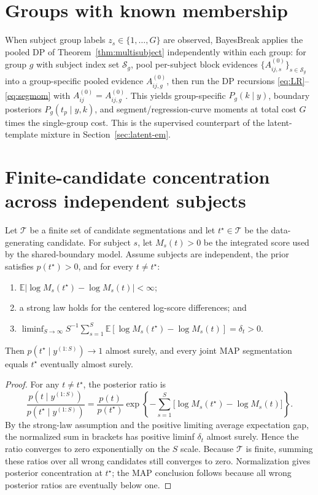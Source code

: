 \section{Groups with known membership}
\label{sec:groups-known}

When subject group labels $z_s\in\{1,\dots,G\}$ are observed, BayesBreak applies the pooled DP
of Theorem~\ref{thm:multisubject} independently within each group: for group $g$ with subject
index set $\mathcal{S}_g$, pool per-subject block evidences
$\{A^{(0)}_{ij,s}\}_{s\in\mathcal{S}_g}$ into a group-specific pooled evidence
$A^{(0)}_{ij,g}$, then run the DP recursions \eqref{eq:LR}--\eqref{eq:segmom} with
$A^{(0)}_{ij}=A^{(0)}_{ij,g}$. This yields group-specific $P_g(k\mid y)$, boundary posteriors
$P_g(t_p\mid y,k)$, and segment/regression-curve moments at total cost $G$ times the
single-group cost. This is the supervised counterpart of the latent-template mixture in
Section~\ref{sec:latent-em}.


\section{Finite-candidate concentration across independent subjects}
\begin{theorem}
\label{prop:shared-boundary-identifiability}
Let $\mathcal T$ be a finite set of candidate segmentations and let $t^\star\in\mathcal T$ be the
data-generating candidate. For subject $s$, let $M_s(t)>0$ be the integrated score used by the
shared-boundary model. Assume subjects are independent, the prior satisfies $p(t^\star)>0$, and for
every $t\ne t^\star$:
\begin{enumerate}[label=(\roman*)]
\item $\mathbb E|\log M_s(t^\star)-\log M_s(t)|<\infty$;
\item a strong law holds for the centered log-score differences; and
\item $\liminf_{S\to\infty}S^{-1}\sum_{s=1}^S
\mathbb E[\log M_s(t^\star)-\log M_s(t)]=\delta_t>0$.
\end{enumerate}
Then $p(t^\star\mid y^{(1:S)})\to1$ almost surely, and every joint MAP segmentation equals
$t^\star$ eventually almost surely.
\end{theorem}
\begin{proof}
For any $t\ne t^\star$, the posterior ratio is
\[
 \frac{p(t\mid y^{(1:S)})}{p(t^\star\mid y^{(1:S)})}
 =\frac{p(t)}{p(t^\star)}
 \exp\left\{-\sum_{s=1}^S\bigl[\log M_s(t^\star)-\log M_s(t)\bigr]\right\}.
\]
By the strong-law assumption and the positive limiting average expectation gap, the normalized sum
in brackets has positive liminf $\delta_t$ almost surely. Hence the ratio converges to zero
exponentially on the $S$ scale. Because $\mathcal T$ is finite, summing these ratios over all wrong
candidates still converges to zero. Normalization gives posterior concentration at $t^\star$; the
MAP conclusion follows because all wrong posterior ratios are eventually below one.
\end{proof}

